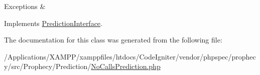\begin{DoxyExceptions}{Exceptions}
{\em } & \\
\hline
\end{DoxyExceptions}


Implements \mbox{\hyperlink{interface_prophecy_1_1_prediction_1_1_prediction_interface_a8753cea9fc952add136830abab587633}{Prediction\+Interface}}.



The documentation for this class was generated from the following file\+:\begin{DoxyCompactItemize}
\item 
/\+Applications/\+X\+A\+M\+P\+P/xamppfiles/htdocs/\+Code\+Igniter/vendor/phpspec/prophecy/src/\+Prophecy/\+Prediction/\mbox{\hyperlink{_no_calls_prediction_8php}{No\+Calls\+Prediction.\+php}}\end{DoxyCompactItemize}
